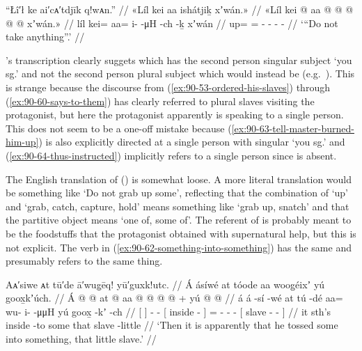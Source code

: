 \ex\label{ex:90-61-dont-take-anything}%
%
\begingl
	\glpreamble	“Łî′ł ke ai′cᴀ′tdjīk q!wᴀn.” //
	\glpreamble	«\!Líl kei aa ishátjiḵ xʼwán.\!» //
	\gla	«\!Líl kei @ aa @  @ {} @ {} @ {} @ {} xʼwán.\!» //
	\glb	\pqp{}líl kei= aa= i-  -μH -ch -ḵ xʼwán //
	\glc	\pqp{} up= = -  - - -  //
	\glft	‘“Do not take anything”.’
		//
\endgl
\xe

\citeauthor{swanton:1909}’s transcription  clearly suggets  which has the second person singular subject  ‘you sg.’ and not the second person plural subject  which would instead be  (e.g.\ ).
This is strange because the discourse from (\ref{ex:90-53-ordered-his-slaves}) through (\ref{ex:90-60-says-to-them}) has clearly referred to plural slaves visiting the protagonist, but here the protagonist apparently is speaking to a single person.
This does not seem to be a one-off mistake because (\ref{ex:90-63-tell-master-burned-him-up}) is also explicitly directed at a single person with singular  ‘you sg.’ and (\ref{ex:90-64-thus-instructed}) implicitly refers to a single person since  is absent.

The English translation of (\lastx) is somewhat loose.
A more literal translation would be something like ‘Do not grab up some’, reflecting that the combination of  ‘up’ and  ‘grab, catch, capture, hold’ means something like ‘grab up, snatch’ and that the partitive object  means ‘one of, some of’.
The referent of  is probably meant to be the foodstuffs that the protagonist obtained with supernatural help, but this is not explicit.
The verb in (\ref{ex:90-62-something-into-something}) has the same  and presumably refers to the same thing.

\ex\label{ex:90-62-something-into-something}%
%
\begingl
	\glpreamble	Aᴀ′siwe ᴀt tū′de ā′wug̣ēq! yū′guxk!utc. //
	\glpreamble	Á ásíwé at tóode aa woog̱éixʼ yú goox̱kʼúch. //
	\gla	{} Á {}  @ {} @ {}
		{} at  @ {} {}
		aa @  @ {} @ {} @ {} +
		{} yú  @ {} @ {} {} //
	\glb	{} á {} á -sí -wé
		{} at tú -dé {}
		aa= wu- i-  -μμH
		{} yú goox̱ -kʼ -ch {} //
	\glc	{}[  {}]  - -
		{}[  inside - {}]
		= - -  -
		{}[  slave - - {}] //
	\gld	{} it {}  {} {}
		{} sth’s inside -to {}
		some  {} {} {}
		{} that slave -little {} {} //
	\glft	‘Then it is apparently that he tossed some into something, that little slave.’
		//
\endgl
\xe

